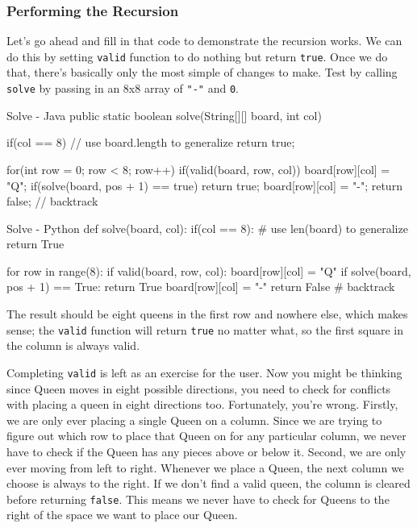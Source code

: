 \subsubsection{Performing the Recursion}

Let's go ahead and fill in that code to demonstrate the recursion works.  We can do this by setting \texttt{valid} function to do nothing but return  \texttt{true}.  Once we do that, there's basically only the most simple of changes to make.  Test by calling \texttt{solve} by passing in an 8x8 array of \texttt{"-"} and \texttt{0}.

\begin{javacode}[listing and comment, comment={}]{Solve - Java}
public static boolean solve(String[][] board, int col){
	if(col == 8) { // use board.length to generalize
		return true;
	}
	
	for(int row = 0; row < 8; row++) {
		if(valid(board, row, col)){
			board[row][col] = "Q";
			if(solve(board, pos + 1) == true){
				return true;
			}
			board[row][col] = "-";
		}
	}
	return false; // backtrack
}
\end{javacode}


\begin{pycode}[listing and comment, comment={}]{Solve - Python}
def solve(board, col):
	if(col == 8): # use len(board) to generalize
		return True
	
	for row in range(8):
		if valid(board, row, col):
			board[row][col] = "Q"
			if solve(board, pos + 1) == True:
				return True
			board[row][col] = "-"
	return False # backtrack
\end{pycode}


The result should be eight queens in the first row and nowhere else, which makes sense; the \texttt{valid} function will return \texttt{true} no matter what, so the first square in the column is always valid. 

Completing \texttt{valid} is left as an exercise for the user.  
Now you might be thinking since Queen moves in eight possible directions, you need to check for conflicts with placing a queen in eight directions too.  Fortunately,  you're wrong.  Firstly, we are only ever placing a single Queen on a column.  Since we are trying to figure out which row to place that Queen on  for any particular column, we never have to check if the Queen has any pieces above or below it.  Second, we are only ever moving from left to right.  Whenever we place a Queen, the next column we choose is always to the right.  If we don't find a valid queen, the column is cleared before returning \texttt{false}.  This means we never have to check for Queens to the right of the space we want to place our Queen.

